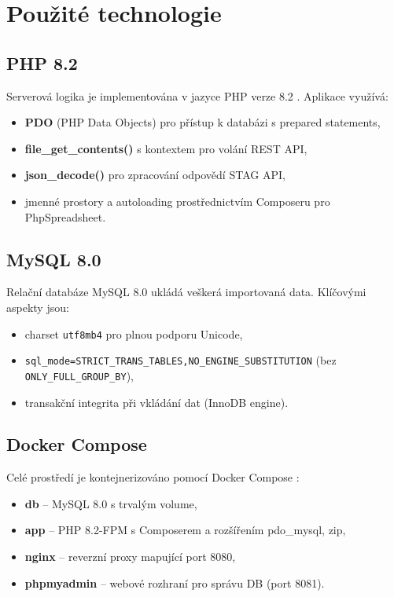 \documentclass[12pt,a4paper]{report}
\begin{document}
\chapter{Použité technologie}

\section{PHP 8.2}

Serverová logika je implementována v jazyce PHP verze 8.2 \cite{php82}. Aplikace využívá:
\begin{itemize}
  \item \textbf{PDO} (PHP Data Objects) pro přístup k databázi s prepared statements,
  \item \textbf{file\_get\_contents()} s kontextem pro volání REST API,
  \item \textbf{json\_decode()} pro zpracování odpovědí STAG API,
  \item jmenné prostory a autoloading prostřednictvím Composeru pro PhpSpreadsheet.
\end{itemize}

\section{MySQL 8.0}

Relační databáze MySQL 8.0 \cite{mysql80} ukládá veškerá importovaná data. Klíčovými aspekty jsou:
\begin{itemize}
  \item charset \texttt{utf8mb4} pro plnou podporu Unicode,
  \item \texttt{sql\_mode=STRICT\_TRANS\_TABLES,NO\_ENGINE\_SUBSTITUTION} (bez \texttt{ONLY\_FULL\_GROUP\_BY}),
  \item transakční integrita při vkládání dat (InnoDB engine).
\end{itemize}

\section{Docker Compose}

Celé prostředí je kontejnerizováno pomocí Docker Compose \cite{docker}:
\begin{itemize}
  \item \textbf{db} -- MySQL 8.0 s trvalým volume,
  \item \textbf{app} -- PHP 8.2-FPM s Composerem a rozšířením pdo\_mysql, zip,
  \item \textbf{nginx} -- reverzní proxy mapující port 8080,
  \item \textbf{phpmyadmin} -- webové rozhraní pro správu DB (port 8081).
\end{itemize}
\end{document}
